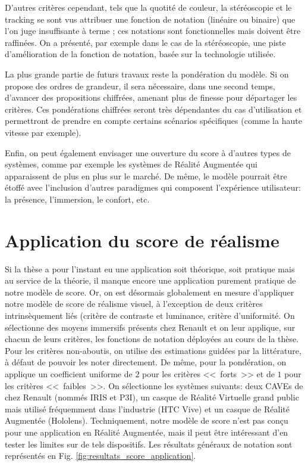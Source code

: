 	\par D'autres critères cependant, tels que la quotité de couleur, la stéréoscopie et le tracking se sont vus attribuer une fonction de notation (linéaire ou binaire) que l'on juge insuffisante à terme ; ces notations sont fonctionnelles mais doivent être raffinées. On a présenté, par exemple dans le cas de la stéréoscopie, une piste d'amélioration de la fonction de notation, basée sur la technologie utilisée.
	
	\par La plus grande partie de futurs travaux reste la pondération du modèle. Si on propose des ordres de grandeur, il sera nécessaire, dans une second temps, d'avancer des propositions chiffrées, amenant plus de finesse pour départager les critères. Ces pondérations chiffrées seront très dépendantes du cas d'utilisation et permettront de prendre en compte certains scénarios spécifiques (comme la haute vitesse par exemple).
	
	\par Enfin, on peut également envisager une ouverture du score à d'autres types de systèmes, comme par exemple les systèmes de Réalité Augmentée qui apparaissent de plus en plus sur le marché. De même, le modèle pourrait être étoffé avec l'inclusion d'autres paradigmes qui composent l'expérience utilisateur: la présence, l'immersion, le confort, etc.

\section*{Application du score de réalisme}
\par Si la thèse a pour l'instant eu une application soit théorique, soit pratique mais au service de la théorie, il manque encore une application purement pratique de notre modèle de score. Or, on est désormais globalement en mesure d'appliquer notre modèle de score de réalisme visuel, à l'exception de deux critères intrinsèquement liés (critère de contraste et luminance, critère d'uniformité. On sélectionne des moyens immersifs présents chez Renault et on leur applique, sur chacun de leurs critères, les fonctions de notation déployées au cours de la thèse. Pour les critères non-aboutis, on utilise des estimations guidées par la littérature, à défaut de pouvoir les noter directement. De même, pour la pondération, on applique un coefficient uniforme de $2$ pour les critères <<~forts~>> et de $1$ pour les critères <<~faibles~>>. On sélectionne les systèmes suivants: deux CAVEs de chez Renault (nommés IRIS et P3I), un casque de Réalité Virtuelle grand public mais utilisé fréquemment dans l'industrie (HTC Vive) et un casque de Réalité Augmentée (Hololens). Techniquement, notre modèle de score n'est pas conçu pour une application en Réalité Augmentée, mais il peut être intéressant d'en tester les limites sur de tels dispositifs. Les résultats généraux de notation sont représentés en Fig. \ref{fig:resultats_score_application}.

